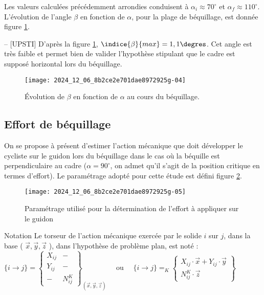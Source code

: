Les valeurs calculées précédemment arrondies conduisent à \(\alpha_{i} \approx 70^{\circ}\) et \(\alpha_{f} \approx 110^{\circ}\). L'évolution de l'angle \(\beta\) en fonction de \(\alpha\), pour la plage de béquillage, est donnée figure \ref{fig_24}.

\ifprof
\begin{corrige}-- [UPSTI]
D’après la figure \ref{fig_24}, $\indice{\beta}{max}=1,1\degres$. Cet angle est très faible et permet bien de valider l’hypothèse stipulant que le cadre est supposé horizontal lors du béquillage.
\end{corrige}
\else
\fi

\ifprof
\else
\begin{figure}[!htb]
\begin{center}
\texttt{[image: 2024\_12\_06\_8b2ce2e701dae8972925g-04]}
\caption{Évolution de \(\beta\) en fonction de \(\alpha\) au cours du béquillage. \label{fig_24}}
\end{center}
\end{figure}
\fi


\subsection{Effort de béquillage}
\ifprof
\else
On se propose à présent d'estimer l'action mécanique que doit développer le cycliste sur le guidon lors du béquillage dans le cas où la béquille est perpendiculaire au cadre (\(\alpha=90^{\circ}\), on admet qu'il s'agit de la position critique en termes d'effort). Le paramétrage adopté pour cette étude est défini figure \ref{fig_25}.\\

\begin{figure}[!htb]
\begin{center}
\texttt{[image: 2024\_12\_06\_8b2ce2e701dae8972925g-05]}
\caption{Paramétrage utilisé pour la détermination de l'effort à appliquer sur le guidon \label{fig_25}}
\end{center}
\end{figure}


Notation Le torseur de l'action mécanique exercée par le solide \(i\) sur \(j\), dans la base ( \(\vec{x}, \vec{y}, \vec{z}\) ), dans l'hypothèse de problème plan, est noté :
$
\{i \rightarrow j\}=\left\{\begin{array}{c|c}
X_{i j} & - \\
Y_{i j} & - \\
- & N_{i j}^{K}
\end{array}\right\}_{(\vec{x}, \vec{y}, \vec{z})} \quad \text { ou } \quad\{i \rightarrow j\}=_{K}\left\{\begin{array}{c}
X_{i j} \cdot \vec{x}+Y_{i j} \cdot \vec{y} \\
N_{i j}^{K} \cdot \vec{z}
\end{array}\right\}
$

